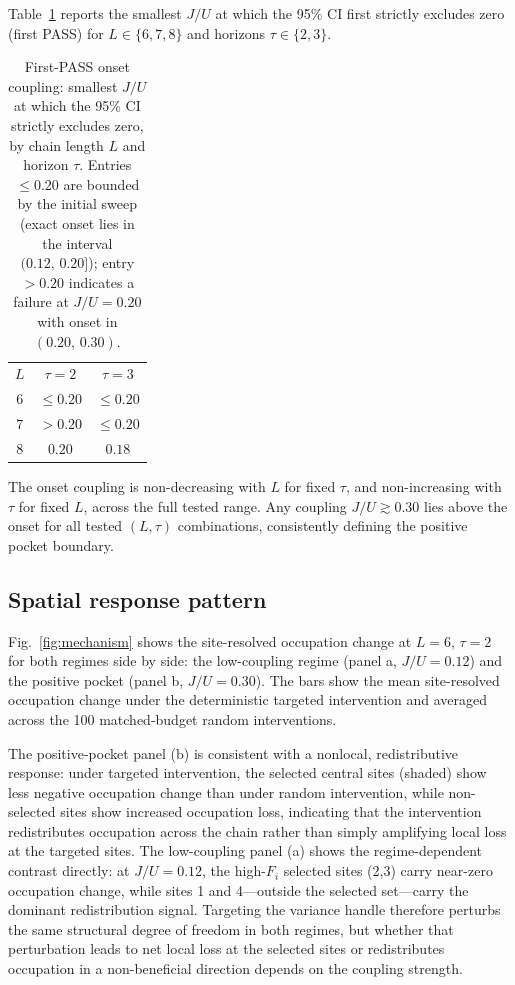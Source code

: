 \documentclass[aps,prresearch,reprint,amsmath,amssymb,longbibliography,floatfix]{revtex4-2}
\newcommand{\Fi}{F_i}
\begin{document}
Table~\ref{tab:onset} reports the smallest $J/U$ at which the 95\% CI first
strictly excludes zero (first PASS) for $L\in\{6,7,8\}$ and horizons
$\tau\in\{2,3\}$.

\begin{table}[tbp]
\centering
\caption{First-PASS onset coupling: smallest $J/U$ at which the 95\% CI
strictly excludes zero, by chain length $L$ and horizon $\tau$.
Entries $\leq\!0.20$ are bounded by the initial sweep (exact onset lies
in the interval $(0.12,\,0.20]$); entry $>\!0.20$ indicates a failure at
$J/U=0.20$ with onset in $(0.20,\,0.30)$.}
\label{tab:onset}
\begin{ruledtabular}
\begin{tabular}{ccc}
$L$ & $\tau=2$ & $\tau=3$ \\
\colrule
$6$ & $\leq0.20$ & $\leq0.20$ \\
$7$ & $>0.20$    & $\leq0.20$ \\
$8$ & $0.20$     & $0.18$     \\
\end{tabular}
\end{ruledtabular}
\end{table}

The onset coupling is non-decreasing with $L$ for fixed $\tau$,
and non-increasing with $\tau$ for fixed $L$, across the full tested range.
Any coupling $J/U\gtrsim0.30$ lies above the onset for all tested
$(L,\tau)$ combinations, consistently defining the positive pocket boundary.

\subsection{Spatial response pattern}

Fig.~\ref{fig:mechanism} shows the site-resolved occupation change at
$L=6$, $\tau=2$ for both regimes side by side: the low-coupling regime
(panel a, $J/U=0.12$) and the positive pocket (panel b, $J/U=0.30$).
The bars show the mean site-resolved occupation change under the
deterministic targeted intervention and averaged across the 100
matched-budget random interventions.

The positive-pocket panel (b) is consistent with a nonlocal, redistributive
response: under targeted intervention, the selected central sites (shaded)
show less negative occupation change than under random intervention, while
non-selected sites show increased occupation loss, indicating that the
intervention redistributes occupation across the chain rather than simply
amplifying local loss at the targeted sites.
The low-coupling panel (a) shows the regime-dependent contrast directly:
at $J/U=0.12$, the high-$\Fi$ selected sites (2,3) carry near-zero
occupation change, while sites 1 and 4---outside the selected set---carry
the dominant redistribution signal.
Targeting the variance handle therefore perturbs the same structural
degree of freedom in both regimes, but whether that perturbation leads to
net local loss at the selected sites or redistributes occupation in a
non-beneficial direction depends on the coupling strength.
\end{document}
